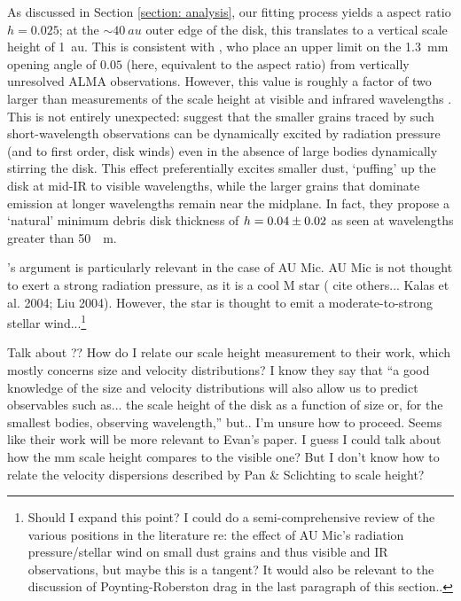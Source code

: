 \documentclass[12pt,oneside]{article}
\begin{document}
As discussed in Section \ref{section: analysis}, our fitting process yields a aspect ratio $h = 0.025$; at the $\sim \SI{40}{au}$ outer edge of the disk, this translates to a vertical scale height of \SI{1}{au}.
This is consistent with \cite{schuppler17}, who place an upper limit on the \SI{1.3}{mm} opening angle of $0.05$ (here, equivalent to the aspect ratio) from vertically unresolved ALMA observations. 
However, this value is roughly a factor of two larger than measurements of the scale height at visible and infrared wavelengths \citep{schneider14,krist05,metchev05}. 
This is not entirely unexpected: \cite{thebault09} suggest that the smaller grains traced by such short-wavelength observations can be dynamically excited by radiation pressure (and to first order, disk winds) even in the absence of large bodies dynamically stirring the disk. 
This effect preferentially excites smaller dust, `puffing' up the disk at mid-IR to visible wavelengths, while the larger grains that dominate emission at longer wavelengths remain near the midplane.
In fact, they propose a `natural' minimum debris disk thickness of $h = \num{0.04 \pm 0.02}$ as seen at wavelengths greater than \SI{50}{\mu \meter}.

\cite{thebault09}'s argument is particularly relevant in the case of AU Mic. 
AU Mic is not thought to exert a strong radiation pressure, as it is a cool M star (\cite{krist05} cite others... Kalas et al. 2004; Liu 2004).
However, the star is thought to emit a moderate-to-strong stellar wind...\footnote{Should I expand this point? I could do a semi-comprehensive review of the various positions in the literature re: the effect of AU Mic's radiation pressure/stellar wind on small dust grains and thus visible and IR observations, but maybe this is a tangent? It would also be relevant to the discussion of Poynting-Roberston drag in the last paragraph of this section..}

Talk about \cite{pan&schlichting12}?? How do I relate our scale height measurement to their work, which mostly concerns size and velocity distributions? I know they say that ``a good knowledge of the size and velocity distributions will also allow us to predict observables such as... the scale height of the disk as a function of size or, for the smallest bodies, observing wavelength,'' but.. I'm unsure how to proceed. Seems like their work will be more relevant to Evan's paper. I guess I could talk about how the mm scale height compares to the visible one? But I don't know how to relate the velocity dispersions described by Pan \& Sclichting to scale height?
\end{document}
